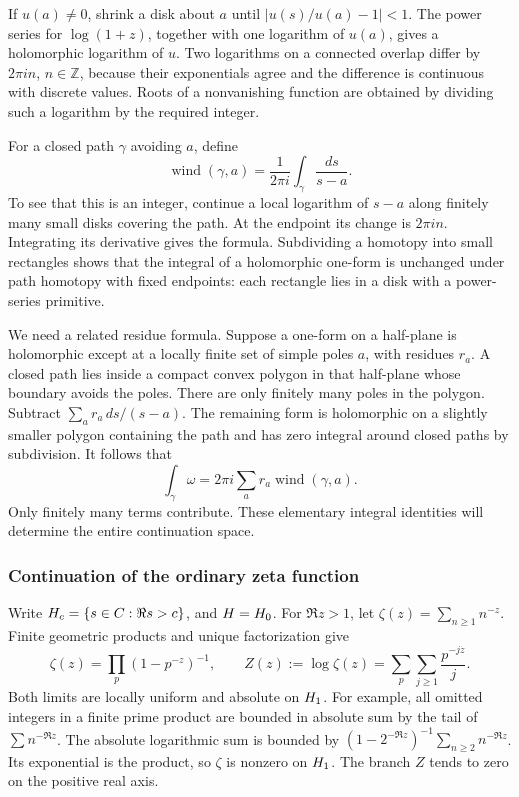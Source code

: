 If \(u(a)\ne0\), shrink a disk about \(a\) until
\(|u(s)/u(a)-1|<1\).  The power series for \(\log(1+z)\), together
with one logarithm of \(u(a)\), gives a holomorphic logarithm of \(u\).
Two logarithms on a connected overlap differ by \(2\pi i n\),
\(n\in\mathbb Z\), because their exponentials agree and the difference
is continuous with discrete values.  Roots of a nonvanishing function
are obtained by dividing such a logarithm by the required integer.

For a closed path \(\gamma\) avoiding \(a\), define
\[
 \operatorname{wind}(\gamma,a)
 =\frac1{2\pi i}\int_\gamma\frac{ds}{s-a}.
\]
To see that this is an integer, continue a local logarithm of \(s-a\)
along finitely many small disks covering the path.  At the endpoint its
change is \(2\pi i n\).  Integrating its derivative gives the formula.
Subdividing a homotopy into small rectangles shows that the integral
of a holomorphic one-form is unchanged under path homotopy with fixed
endpoints: each rectangle lies in a disk with a power-series primitive.

We need a related residue formula.  Suppose a one-form on a half-plane
is holomorphic except at a locally finite set of simple poles \(a\),
with residues \(r_a\).  A closed path lies inside a compact convex polygon
in that half-plane whose boundary avoids the poles.
There are only finitely many poles in the polygon.
Subtract \(\sum_a r_a\,ds/(s-a)\).  The remaining form is holomorphic
on a slightly smaller polygon containing the path and has zero integral
around closed paths by subdivision.  It follows that
\[
 \int_\gamma\omega
 =2\pi i\sum_a r_a\operatorname{wind}(\gamma,a).
\]
Only finitely many terms contribute.  These elementary integral identities
will determine the entire continuation space.

\subsubsection{Continuation of the ordinary zeta function}

Write \(H_c=\{s\in C:\Re s>c\}\), and \(H=H_0\).
For \(\Re z>1\), let \(\zeta(z)=\sum_{n\geq1}n^{-z}\).
Finite geometric products and unique factorization give
\[
 \zeta(z)=\prod_p(1-p^{-z})^{-1},\qquad
 Z(z):=\log\zeta(z)=\sum_p\sum_{j\geq1}\frac{p^{-jz}}j.
\]
Both limits are locally uniform and absolute on \(H_1\).
For example, all omitted integers in a finite prime product are bounded
in absolute sum by the tail of \(\sum n^{-\Re z}\).
The absolute logarithmic sum is bounded by
\((1-2^{-\Re z})^{-1}\sum_{n\geq2}n^{-\Re z}\).
Its exponential is the product, so \(\zeta\) is nonzero on \(H_1\).
The branch \(Z\) tends to zero on the positive real axis.

